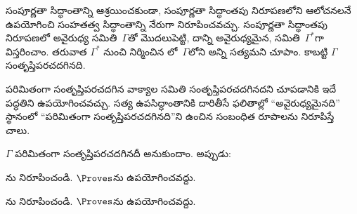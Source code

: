 \documentclass[../../../include/open-logic-section]{subfiles}
\begin{document}
      {}
      {}


సంపూర్ణతా సిద్ధాంతాన్ని ఆశ్రయించకుండా, సంపూర్ణతా సిద్ధాంతపు నిరూపణలోని
ఆలోచనలనే ఉపయోగించి సంహతత్వ సిద్ధాంతాన్ని నేరుగా నిరూపించవచ్చు.
సంపూర్ణతా సిద్ధాంతపు నిరూపణలో అవైరుధ్య  సమితి~$\Gamma$తో
మొదలుపెట్టి, దాన్ని అవైరుధ్యమైన,
  సమితి~$\Gamma^*$గా విస్తరించాం. తరువాత
$\Gamma^*$ నుంచి నిర్మించిన 
లో~$\Gamma$లోని అన్ని  సత్యమని చూపాం. కాబట్టి $\Gamma$
సంతృప్తిపరచదగినది.

పరిమితంగా సంతృప్తిపరచదగిన వాక్యాల సమితి సంతృప్తిపరచదగినదని చూపడానికి
ఇదే పద్ధతిని ఉపయోగించవచ్చు. సత్య ఉపసిద్ధాంతానికి దారితీసే ఫలితాల్లో
``అవైరుధ్యమైనది'' స్థానంలో ``పరిమితంగా సంతృప్తిపరచదగినది''ని ఉంచిన
సంబంధిత రూపాలను నిరూపిస్తే చాలు.

\begin{prop}
$\Gamma$  పరిమితంగా సంతృప్తిపరచదగినదీ అనుకుందాం. అప్పుడు:
\begin{enumerate}


\end{enumerate}
\end{prop}

\begin{prob}
ను నిరూపించండి. $\Proves$ను
ఉపయోగించవద్దు.
\end{prob}
\tagendprob

\begin{prob}
ను నిరూపించండి. $\Proves$ను
ఉపయోగించవద్దు.
\end{prob}
\tagendprob

\end{document}
